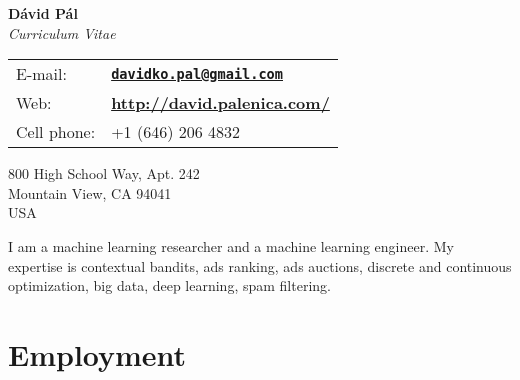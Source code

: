 \documentclass[9pt]{article}
\begin{document}
\begin{center}
{\huge \textbf{D\'avid P\'al}} \\[0.2cm]
\emph{Curriculum Vitae}
\end{center}

\vspace{0.2cm}

%
\noindent
%
\begin{minipage}{10cm}
\begin{tabular}{@{}ll}
E-mail:      & \href{mailto:davidko.pal@gmail.com}{\textbf{\texttt{davidko.pal@gmail.com}}} \\[0.1cm]
Web:         & \textbf{\url{http://david.palenica.com/}} \\[0.1cm]
Cell phone:  & +1 (646) 206 4832 \\[0.1cm]
\end{tabular}
\end{minipage}
%
\begin{minipage}{10cm}
800 High School Way, Apt. 242 \\
Mountain View, CA 94041 \\
USA \\
\end{minipage}


\vspace{0.3cm}

\noindent I am a machine learning researcher and a machine learning engineer.
My expertise is contextual bandits, ads ranking, ads auctions, discrete and
continuous optimization, big data, deep learning, spam filtering.

\section*{Employment}
\end{document}
